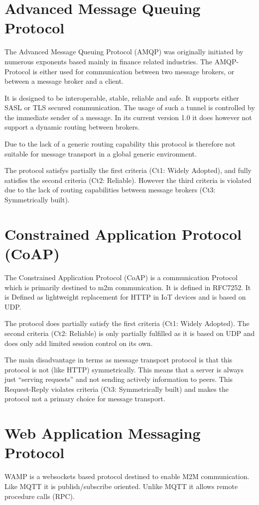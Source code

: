\section{Advanced Message Queuing Protocol}
The Advanced Message Queuing Protocol (AMQP) was originally initiated by numerous exponents based mainly in finance related industries. The AMQP-Protocol is either used for communication between two message brokers, or between a message broker and a client\cite{amqp}.

It is designed to be interoperable, stable, reliable and safe. It supports either SASL or TLS secured communication. The usage of such a tunnel is controlled by the immediate sender of a message. In its current version 1.0 it does however not support a dynamic routing between brokers\cite{amqp}.

Due to the lack of a generic routing capability this protocol is therefore not suitable for message transport in a global generic environment.

The protocol satisfys partially the first criteria (Ct1: Widely Adopted), and fully satisfies the second criteria (Ct2: Reliable). However the third criteria is violated due to the lack of routing capabilities between message brokers (Ct3: Symmetrically built).

\section{Constrained Application Protocol (CoAP)}
The Constrained Application Protocol (CoAP) is a communication Protocol which is primarily destined to m2m communication. It is defined in RFC7252\cite{RFC7252}.  It is Defined as lightweight replacement for HTTP in IoT devices and is based on UDP.

The protocol does partially satisfy the first criteria (Ct1: Widely Adopted). The second criteria (Ct2: Reliable) is only partially fulfilled as it is based on UDP and does only add limited session control on its own.

The main disadvantage in terms as message transport protocol is that this protocol is not (like HTTP) symmetrically. This means that a server is always just ``serving requests'' and not sending actively information to peers. This Request-Reply violates criteria (Ct3: Symmetrically built) and makes the protocol not a primary choice for  message transport. 

\section{Web Application Messaging Protocol}
WAMP is a websockets based protocol destined to enable M2M communication. Like MQTT it is publish/subscribe oriented. Unlike MQTT it allows remote procedure calls (RPC).

